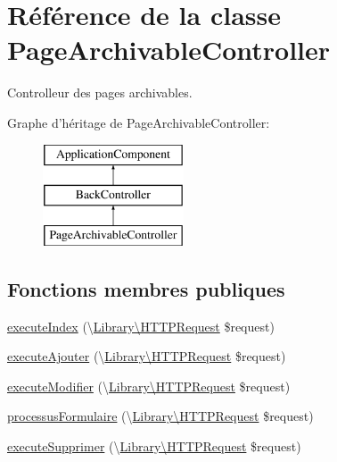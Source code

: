 \hypertarget{class_applications_1_1_backend_1_1_modules_1_1_page_archivable_1_1_page_archivable_controller}{\section{Référence de la classe Page\+Archivable\+Controller}
\label{class_applications_1_1_backend_1_1_modules_1_1_page_archivable_1_1_page_archivable_controller}
}


Controlleur des pages archivables.  


Graphe d'héritage de Page\+Archivable\+Controller\+:\begin{figure}[H]
\begin{center}
\leavevmode
\includegraphics[height=3.000000cm]{class_applications_1_1_backend_1_1_modules_1_1_page_archivable_1_1_page_archivable_controller}
\end{center}
\end{figure}
\subsection*{Fonctions membres publiques}
\begin{DoxyCompactItemize}
\item 
\hyperlink{class_applications_1_1_backend_1_1_modules_1_1_page_archivable_1_1_page_archivable_controller_ac9c6fe801e9ac09e4a395ad64c76ed04}{execute\+Index} (\textbackslash{}\hyperlink{class_library_1_1_h_t_t_p_request}{Library\textbackslash{}\+H\+T\+T\+P\+Request} \$request)
\item 
\hyperlink{class_applications_1_1_backend_1_1_modules_1_1_page_archivable_1_1_page_archivable_controller_adf056b6997127e682bbd4ae668d0a247}{execute\+Ajouter} (\textbackslash{}\hyperlink{class_library_1_1_h_t_t_p_request}{Library\textbackslash{}\+H\+T\+T\+P\+Request} \$request)
\item 
\hyperlink{class_applications_1_1_backend_1_1_modules_1_1_page_archivable_1_1_page_archivable_controller_ae86ff917aafe384e7fb46673719cba62}{execute\+Modifier} (\textbackslash{}\hyperlink{class_library_1_1_h_t_t_p_request}{Library\textbackslash{}\+H\+T\+T\+P\+Request} \$request)
\item 
\hyperlink{class_applications_1_1_backend_1_1_modules_1_1_page_archivable_1_1_page_archivable_controller_a8e3be54836a0615d184b6e518218bda5}{processus\+Formulaire} (\textbackslash{}\hyperlink{class_library_1_1_h_t_t_p_request}{Library\textbackslash{}\+H\+T\+T\+P\+Request} \$request)
\item 
\hyperlink{class_applications_1_1_backend_1_1_modules_1_1_page_archivable_1_1_page_archivable_controller_a6bb898240e821bbbb62bf86cb12a1bc2}{execute\+Supprimer} (\textbackslash{}\hyperlink{class_library_1_1_h_t_t_p_request}{Library\textbackslash{}\+H\+T\+T\+P\+Request} \$request)
\end{DoxyCompactItemize}
